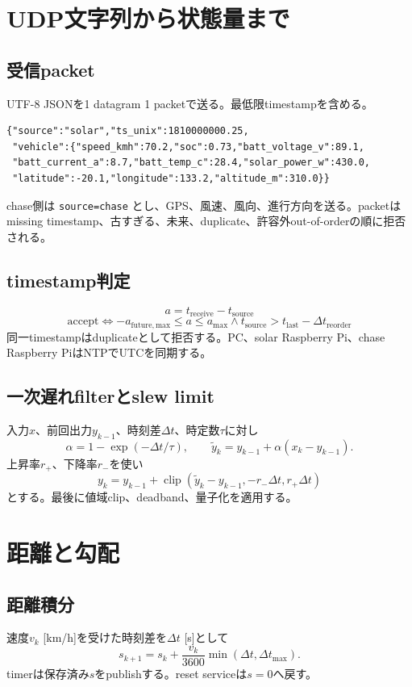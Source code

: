 \documentclass[a4paper,10pt,oneside]{book}
\begin{document}
\chapter{UDP文字列から状態量まで}
\section{受信packet}
UTF-8 JSONを1 datagram 1 packetで送る。最低限timestampを含める。
\begin{lstlisting}
{"source":"solar","ts_unix":1810000000.25,
 "vehicle":{"speed_kmh":70.2,"soc":0.73,"batt_voltage_v":89.1,
 "batt_current_a":8.7,"batt_temp_c":28.4,"solar_power_w":430.0,
 "latitude":-20.1,"longitude":133.2,"altitude_m":310.0}}
\end{lstlisting}
chase側は \texttt{source=chase} とし、GPS、風速、風向、進行方向を送る。packetはmissing timestamp、古すぎる、未来、duplicate、許容外out-of-orderの順に拒否される。

\section{timestamp判定}
\[
a=t_{\mathrm{receive}}-t_{\mathrm{source}}
\]
\[
\mathrm{accept}\iff -a_{\mathrm{future,max}}\le a\le a_{\mathrm{max}}
\land t_{\mathrm{source}}>t_{\mathrm{last}}-\Delta t_{\mathrm{reorder}}
\]
同一timestampはduplicateとして拒否する。PC、solar Raspberry Pi、chase Raspberry PiはNTPでUTCを同期する。

\section{一次遅れfilterとslew limit}
入力$x$、前回出力$y_{k-1}$、時刻差$\Delta t$、時定数$\tau$に対し
\[
\alpha=1-\exp(-\Delta t/\tau),\qquad
\tilde y_k=y_{k-1}+\alpha(x_k-y_{k-1}).
\]
上昇率$r_+$、下降率$r_-$を使い
\[
y_k=y_{k-1}+\operatorname{clip}(\tilde y_k-y_{k-1},-r_-\Delta t,r_+\Delta t)
\]
とする。最後に値域clip、deadband、量子化を適用する。

\chapter{距離と勾配}
\section{距離積分}
速度$v_k$ [km/h]を受けた時刻差を$\Delta t$ [s]として
\[
s_{k+1}=s_k+\frac{v_k}{3600}\min(\Delta t,\Delta t_{\max}).
\]
timerは保存済み$s$をpublishする。reset serviceは$s=0$へ戻す。
\end{document}
